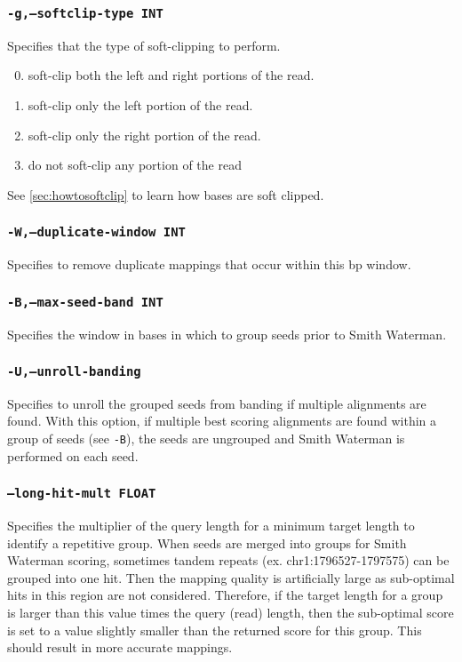 \documentclass[a4paper,12pt]{book}
\newcommand{\TT}[1]{{\tt #1}} %
\begin{document}
\subsubsection{\TT{-g,--softclip-type INT}}
Specifies that the type of soft-clipping to perform.
\begin{enumerate}
	\setcounter{enumi}{-1} %
	\item soft-clip both the left and right portions of the read.
	\item soft-clip only the left portion of the read.
	\item soft-clip only the right portion of the read.
	\item do not soft-clip any portion of the read
\end{enumerate}
See \autoref{sec:howtosoftclip} to learn how bases are soft clipped.

\subsubsection{\TT{-W,--duplicate-window INT}}
Specifies to remove duplicate mappings that occur within this bp window.

\subsubsection{\TT{-B,--max-seed-band INT}}
Specifies the window in bases in which to group seeds prior to Smith Waterman.

\subsubsection{\TT{-U,--unroll-banding}}
Specifies to unroll the grouped seeds from banding if multiple alignments are found.
With this option, if multiple best scoring alignments are found within a group of seeds (see \TT{-B}), the seeds are ungrouped and Smith Waterman is performed on each seed.

\subsubsection{\TT{--long-hit-mult FLOAT}}
Specifies the multiplier of the query length for a minimum target length to identify a repetitive group.
When seeds are merged into groups for Smith Waterman scoring, sometimes tandem repeats (ex. chr1:1796527-1797575) can be grouped into one hit.
Then the mapping quality is artificially large as sub-optimal hits in this region are not considered.
Therefore, if the target length for a group is larger than this value times the query (read) length, then the sub-optimal score is set to a value slightly smaller than the returned score for this group.
This should result in more accurate mappings.
\end{document}
